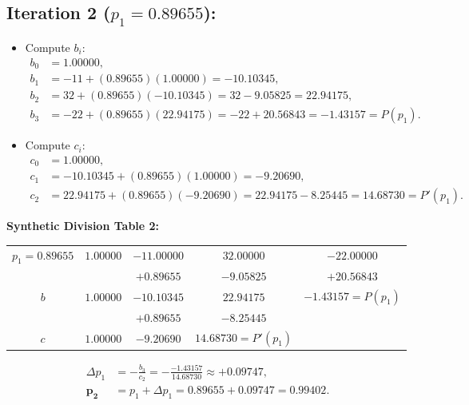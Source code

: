 \documentclass[11pt,a4paper]{article}
\begin{document}
\subsection*{Iteration 2 ($p_1 = 0.89655$):}
\begin{itemize}
    \item Compute $b_i$:
    \begin{align*}
    b_0 &= 1.00000, \\
    b_1 &= -11 + (0.89655)(1.00000) = -10.10345, \\
    b_2 &= 32 + (0.89655)(-10.10345) = 32 - 9.05825 = 22.94175, \\
    b_3 &= -22 + (0.89655)(22.94175) = -22 + 20.56843 = \mathbf{-1.43157} = P(p_1).
    \end{align*}
    \item Compute $c_i$:
    \begin{align*}
    c_0 &= 1.00000, \\
    c_1 &= -10.10345 + (0.89655)(1.00000) = -9.20690, \\
    c_2 &= 22.94175 + (0.89655)(-9.20690) = 22.94175 - 8.25445 = \mathbf{14.68730} = P'(p_1).
    \end{align*}
\end{itemize}

\noindent\textbf{Synthetic Division Table 2:}
\begin{center}
\begin{tabular}{c|cccc}
$p_1 = 0.89655$ & $1.00000$ & $-11.00000$ & $32.00000$ & $-22.00000$ \\
& & $+0.89655$ & $-9.05825$ & $+20.56843$ \\
\midrule
$b$ & $1.00000$ & $-10.10345$ & $22.94175$ & $\mathbf{-1.43157} = P(p_1)$ \\
& & $+0.89655$ & $-8.25445$ & \\
\midrule
$c$ & $1.00000$ & $-9.20690$ & $\mathbf{14.68730} = P'(p_1)$ & \\
\bottomrule
\end{tabular}
\end{center}

\begin{align*}
\Delta p_1 &= -\frac{b_3}{c_2} = -\frac{-1.43157}{14.68730} \approx +0.09747, \\
\mathbf{p_2} &= p_1 + \Delta p_1 = 0.89655 + 0.09747 = \mathbf{0.99402}.
\end{align*}
\end{document}
